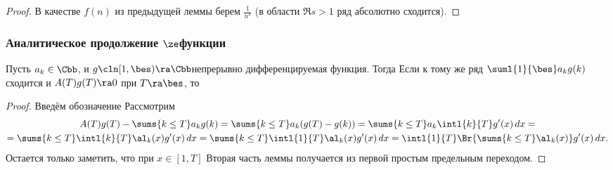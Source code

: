 \documentclass[a4paper]{article}
\def\dx{\,dx}
\begin{document}
\begin{proof}
В качестве $f(n)$ из предыдущей леммы берем $\frac1{n^s}$ (в области $\Re s>1$ ряд абсолютно сходится).
\end{proof}

\subsubsection{Аналитическое продолжение $\ze$\д функции}

\begin{lemma}\label{lem:abelTransform}
Пусть $a_k \in \Cbb$, и $g\cln [1,\bes) \ra \Cbb$\т непрерывно дифференцируемая функция.
Тогда
Если к тому же ряд $\suml{1}{\bes}a_kg(k)$ сходится и $A(T)g(T)\ra 0$ при $T \ra \bes$, то
\end{lemma}

\begin{proof}
Введём обозначение
Рассмотрим
\begin{multline}
A(T)g(T)-\sums{k\le T}a_kg(k)=\sums{k\le T}a_k(g(T)-g(k))=\sums{k\le T}a_k\intl{k}{T}g'(x)\dx=\\=
\sums{k\le T}\intl{k}{T}\al_k(x)g'(x)\dx=\sums{k\le T}\intl{1}{T}\al_k(x)g'(x)\dx=
\intl{1}{T}\Br{\sums{k\le T}\al_k(x)}g'(x)\dx.
\end{multline}
Остается только заметить, что при $x \in [1,T]$
Вторая часть леммы получается из первой простым предельным переходом.
\end{proof}
\end{document}
